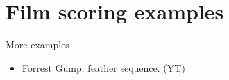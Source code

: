 
\chapter{Film scoring examples}
\label{examples}

More examples
\begin{itemize}
\item Forrest Gump: feather sequence. (YT)



\end{itemize}
